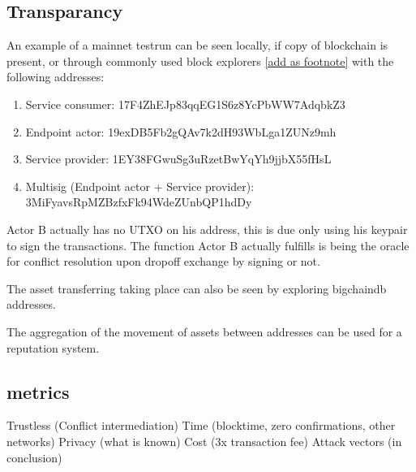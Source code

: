 \subsection{Transparancy}

An example of a mainnet testrun can be seen locally, if copy of blockchain is present, or through commonly used block explorers \href{https://www.blocktrail.com/BTC}{[add as footnote]}
 with the following addresses:
\begin{enumerate}
  \item Service consumer: 17F4ZhEJp83qqEG1S6z8YcPbWW7AdqbkZ3
  \item Endpoint actor: 19exDB5Fb2gQAv7k2dH93WbLga1ZUNz9mh
  \item Service provider: 1EY38FGwuSg3uRzetBwYqYh9jjbX55fHsL
  \item Multisig (Endpoint actor + Service provider): 3MiFyavsRpMZBzfxFk94WdeZUnbQP1hdDy
\end{enumerate}

Actor B actually has no UTXO on his address, this is due only using his keypair to sign the transactions. The function Actor B actually fulfills is being the oracle for conflict resolution upon dropoff exchange by signing or not.\par
The asset transferring taking place can also be seen by exploring bigchaindb addresses. \par
The aggregation of the movement of assets between addresses can be used for a reputation system.

\subsection{metrics}

Trustless (Conflict intermediation)
Time (blocktime, zero confirmations, other networks)
Privacy (what is known)
Cost (3x transaction fee)
Attack vectors (in conclusion)

